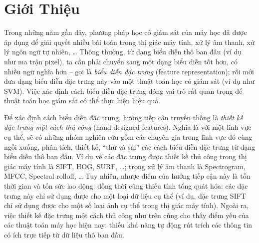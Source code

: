 
\chapter{Giới Thiệu }
\ifpdf
    \graphicspath{{Chapter1/Chapter1Figs/PNG/}{Chapter1/Chapter1Figs/PDF/}{Chapter1/Chapter1Figs/}}
\else
    \graphicspath{{Chapter1/Chapter1Figs/EPS/}{Chapter1/Chapter1Figs/}}
\fi


Trong những năm gần đây, phương pháp học có giám sát của máy học đã được áp dụng để giải quyết nhiều bài toán trong thị giác máy tính, xử lý âm thanh, xử lý ngôn ngữ tự nhiên, … Thông thường, từ dạng biểu diễn thô ban đầu (ví dụ như ma trận pixel), ta cần phải chuyển sang một dạng biểu diễn tốt hơn, có nhiều ngữ nghĩa hơn – gọi là \emph{biểu diễn đặc trưng} (feature representation); rồi mới đưa dạng biểu diễn đặc trưng này vào một thuật toán học có giám sát (ví dụ như SVM). Việc xác định cách biểu diễn đặc trưng đóng vai trò rất quan trọng để thuật toán học giám sát có thể thực hiện hiệu quả. 

Để xác định cách biểu diễn đặc trưng, hướng tiếp cận truyền thống là \emph{thiết kế đặc trưng một cách thủ công} (hand-designed features). Nghĩa là với một lĩnh vực cụ thể, sẽ có những nhóm nghiên cứu gồm các chuyên gia trong lĩnh vực đó cùng ngồi xuống, phân tích, thiết kế, ``thử và sai'' các cách biểu diễn đặc trưng từ dạng biểu diễn thô ban đầu. Ví dụ về các đặc trưng được thiết kế thủ công trong thị giác máy tính là SIFT, HOG, SURF, …; trong xử lý âm thanh là Spectrogram, MFCC, Spectral rolloff, … Tuy nhiên, nhược điểm của hướng tiếp cận này là tốn thời gian và tốn sức lao động; đồng thời cũng thiếu tính tổng quát hóa: các đặc trưng này chỉ sử dụng được cho một loại dữ liệu cụ thể (ví dụ, đặc trưng SIFT chỉ sử dụng được cho một số loại ảnh cụ thể trong thị giác máy tính). Ngoài ra, việc thiết kế đặc trưng một cách thủ công như trên cũng cho thấy điểm yếu của các thuật toán máy học hiện nay: thiếu khả năng tự động rút trích các thông tin có ích trực tiếp từ dữ liệu thô ban đầu.

